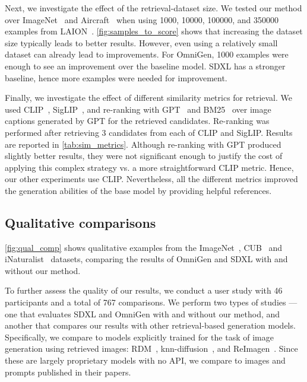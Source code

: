 
Next, we investigate the effect of the retrieval-dataset size. We tested our method over ImageNet~\cite{deng2009imagenet} and Aircraft~\cite{majifine} when using 
\num{1000}, \num{10000}, \num{100000}, and \num{350000} examples from LAION~\cite{schuhmann2022laion}. \cref{fig:samples_to_score} shows that increasing the dataset size typically leads to better results. However, even using a relatively small dataset can already lead to improvements. For OmniGen, \num{1000} examples were enough to see an improvement over the baseline model. SDXL has a stronger baseline, hence more examples were needed for improvement.


Finally, we investigate the effect of different similarity metrics for retrieval. We used CLIP~\cite{radford2021learning}, SigLIP~\cite{zhai2023sigmoid}, and re-ranking with GPT~\cite{hurst2024gpt} and BM25~\cite{robertson2009probabilistic} over image captions generated by GPT for the retrieved candidates. Re-ranking was performed after retrieving $3$ candidates from each of CLIP and SigLIP. Results are reported in \cref{tab:sim_metrics}.
Although re-ranking with GPT produced slightly better results, they were not significant enough to justify the cost of applying this complex strategy vs. a more straightforward CLIP metric. Hence, our other experiments use CLIP. Nevertheless, all the different metrics improved the generation abilities of the base model by providing helpful references.

\subsection{Qualitative comparisons}
\label{sec:qual}



\cref{fig:qual_comp} shows qualitative examples from the ImageNet~\cite{deng2009imagenet}, CUB~\cite{wah2011caltech} and iNaturalist~\cite{van2018inaturalist} datasets, comparing the results of OmniGen and SDXL with and without our method.

To further assess the quality of our results, we conduct a user study with 46 participants and a total of 767 comparisons.
We perform two types of studies --- one that evaluates SDXL and OmniGen with and without our method, and another that compares our results with other retrieval-based generation models. Specifically, we compare to models explicitly trained for the task of image generation using retrieved images: RDM~\cite{blattmann2022retrieval}, knn-diffusion~\cite{sheyninknn}, and ReImagen~\cite{chenre}. Since these are largely proprietary models with no API, we compare to images and prompts published in their papers.

